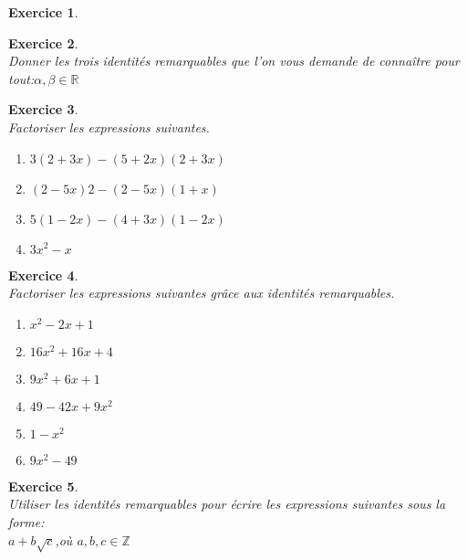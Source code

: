 \documentclass[a4paper,10pt]{article}
\newtheorem{exer}{Exercice}
\begin{document}
\begin{minipage}[t]{1.0\linewidth}
\begin{minipage}[t]{0.4\linewidth}
\begin{exer}
				

		\end{exer}
	
	\end{minipage}
	\hfill\vrule\hfill
	\begin{minipage}[t]{0.4\linewidth}
		\raggedright
		\begin{exer}\quad\hfill\textbf{}\\
				Donner les trois identités remarquables que l'on vous demande de connaître pour tout:\quad $\alpha, \beta\in\mathbb{R}$
			\end{exer}
		\begin{exer}\quad\hfill\textbf{}\\
			 Factoriser les expressions suivantes.

	 		\begin{enumerate}
							\item $3(2 + 3x) - (5 + 2x)(2 + 3x)$
							\item $(2 - 5x)2 - (2 - 5x)(1 + x)$
							\item $5(1 - 2x) - (4 + 3x)(1-2x)$
							\item $3x^2 - x$
			\end{enumerate}

				
			
		\end{exer}
		\begin{exer}\quad\hfill\textbf{}\\
			Factoriser les expressions suivantes grâce aux identités remarquables.
				\begin{multicols}{2}
			\begin{enumerate}
								\item $x^2-2x+1  $
								\item $16x^2+16x+4  $
								\item $9x^2+6x+1 $
								
								\item $49-42x +9x^2$
								\item $1-x^2  $
								\item $9x^2-49$
							\end{enumerate}
				\end{multicols}
				

		\end{exer}
		\begin{exer}\quad\hfill\textbf{}\\
			Utiliser les identités remarquables pour écrire les expressions suivantes
			sous la forme:\\
			 $a+b\sqrt c$,\quad où \quad $a, b, c\in \mathbb{Z}$ \hspace{3cm}


\end{exer}
\end{minipage}
\end{minipage}
\end{document}
